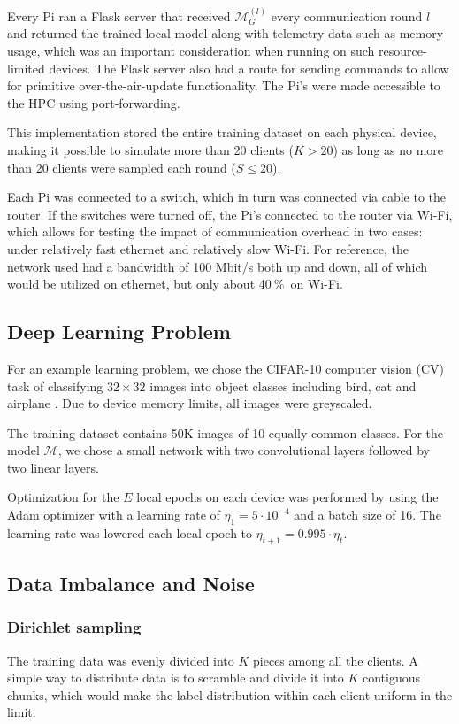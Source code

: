 \documentclass{article}
\newcommand{\unit}[1]{\ensuremath{\:\text{#1}}}
\newcommand{\pro}{\ensuremath{\unit{\%{}}}}
\begin{document}
Every Pi ran a Flask server that received $\mathcal M_G^{(l)}$ every communication round $l$ and returned the trained local model along with telemetry data such as memory usage, which was an important consideration when running on such resource-limited devices.
The Flask server also had a route for sending commands to allow for primitive over-the-air-update functionality.
The Pi's were made accessible to the HPC using port-forwarding.

This implementation stored the entire training dataset on each physical device, making it possible to simulate more than 20 clients ($K > 20$) as long as no more than 20 clients were sampled each round ($S \leq 20$).

Each Pi was connected to a switch, which in turn was connected via cable to the router.
If the switches were turned off, the Pi's connected to the router via Wi-Fi, which allows for testing the impact of communication overhead in two cases: under relatively fast ethernet and relatively slow Wi-Fi.
For reference, the network used had a bandwidth of 100 Mbit/s both up and down, all of which would be utilized on ethernet, but only about 40\pro\ on Wi-Fi.

\subsection{Deep Learning Problem}
For an example learning problem, we chose the CIFAR-10 computer vision (CV) task of classifying $32\times 32$ images into object classes including bird, cat and airplane \cite{alex2009learning}.
Due to device memory limits, all images were greyscaled.

The training dataset contains 50K images of 10 equally common classes.
For the model $\mathcal M$, we chose a small network with two convolutional layers followed by two linear layers.

Optimization for the $E$ local epochs on each device was performed by using the Adam optimizer \cite{kingma2015adam} with a learning rate of $\eta_1 = 5\cdot 10^{-4}$ and a batch size of 16.
The learning rate was lowered each local epoch to $\eta_{t+1} = 0.995\cdot \eta_{t}$.

\subsection{Data Imbalance and Noise}
\subsubsection{Dirichlet sampling}
The training data was evenly divided into $K$ pieces among all the clients.
A simple way to distribute data is to scramble and divide it into $K$ contiguous chunks, which would make the label distribution within each client uniform in the limit.
\end{document}
